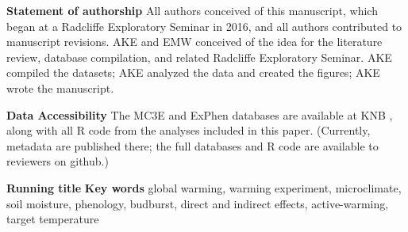 \documentclass{article}
\begin{document}











\date{\today}
\maketitle %

\textbf{Statement of authorship} 
All authors conceived of this manuscript, which began at a Radcliffe Exploratory Seminar in 2016, and all authors contributed to manuscript revisions. AKE and EMW conceived of the idea for the literature review, database compilation, and related Radcliffe Exploratory Seminar. AKE compiled the datasets; AKE analyzed the data and created the figures; AKE wrote the manuscript.

\textbf{Data Accessibility} %
The MC3E and ExPhen databases are available at KNB \citep{ettinger2018}, along with all R code from the analyses included in this paper. (Currently, metadata are published there; the full databases and R code are available to reviewers on github.) 

\textbf{Running title} 
\textbf{Key words} global warming, warming experiment, microclimate, soil moisture, phenology, budburst, direct and indirect effects, active-warming, target temperature


\clearpage
\end{document}
